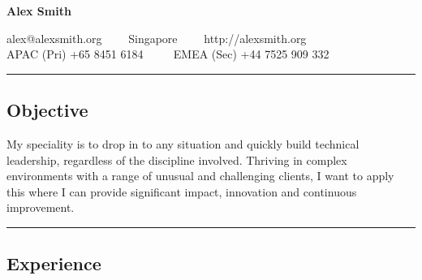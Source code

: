 \documentclass[10pt,a4paper]{article}
\begin{document}
\begin{center}
{\LARGE \textbf{Alex Smith}}


alex@alexsmith.org\ \ \textbullet
\ \ Singapore\ \ \textbullet
\ \ http://alexsmith.org
\\
APAC (Pri) +65 8451 6184 \ \ \textbullet
\ \ EMEA (Sec) +44 7525 909 332
\end{center}

\hrule
\vspace{-0.4em}
\subsection*{Objective}
    My speciality is to drop in to any situation and quickly build technical leadership, regardless of the discipline involved. Thriving in complex environments with a range of unusual and challenging clients, I want to apply this where I can provide significant impact, innovation and continuous improvement.
    \\

\hrule
\vspace{-0.4em}
\subsection*{Experience}
\end{document}
